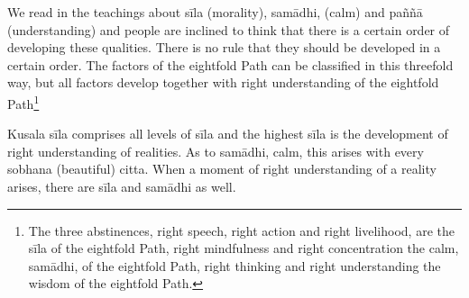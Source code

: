 We read in the teachings about sīla (morality), samādhi,
(calm) and paññā (understanding) and people are inclined to think that
there is a certain order of developing these qualities. There is no rule
that they should be developed in a certain order. The factors of the
eightfold Path can be classified in this threefold way, but all factors
develop together with right understanding of the eightfold Path\footnote{The three abstinences,
right speech, right action and right livelihood, are the sīla of the
eightfold Path, right mindfulness and right concentration the calm,
samādhi, of the eightfold Path, right thinking and right understanding
the wisdom of the eightfold Path. }


Kusala sīla comprises all levels of sīla and the highest sīla
is the development of right understanding of realities. As to samādhi,
calm, this arises with every sobhana (beautiful) citta. When a moment of
right understanding of a reality arises, there are sīla and samādhi as
well.


